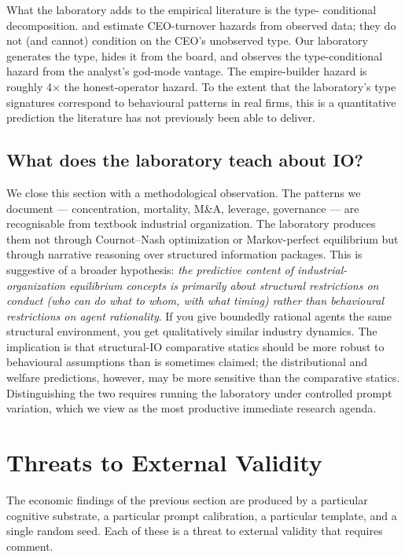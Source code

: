 \documentclass[11pt]{article}
\begin{document}
What the laboratory adds to the empirical literature is the type-
conditional decomposition. \citet{taylor2010ceo} and
\citet{kaplanminton2012} estimate CEO-turnover hazards from
observed data; they do not (and cannot) condition on the CEO's
unobserved type. Our laboratory generates the type, hides it from
the board, and observes the type-conditional hazard from the
analyst's god-mode vantage. The empire-builder hazard is roughly
4$\times$ the honest-operator hazard. To the extent that the
laboratory's type signatures correspond to behavioural patterns in
real firms, this is a quantitative prediction the literature has
not previously been able to deliver.

\subsection{What does the laboratory teach about IO?}

We close this section with a methodological observation. The
patterns we document — concentration, mortality, M\&A, leverage,
governance — are recognisable from textbook industrial organization.
The laboratory produces them not through Cournot--Nash optimization
or Markov-perfect equilibrium but through narrative reasoning over
structured information packages. This is suggestive of a broader
hypothesis: \emph{the predictive content of industrial-organization
equilibrium concepts is primarily about structural restrictions on
conduct (who can do what to whom, with what timing) rather than
behavioural restrictions on agent rationality}. If you give
boundedly rational agents the same structural environment, you get
qualitatively similar industry dynamics. The implication is that
structural-IO comparative statics should be more robust to
behavioural assumptions than is sometimes claimed; the
distributional and welfare predictions, however, may be more
sensitive than the comparative statics. Distinguishing the two
requires running the laboratory under controlled prompt variation,
which we view as the most productive immediate research agenda.

\section{Threats to External Validity}\label{sec:threats}

The economic findings of the previous section are produced by a
particular cognitive substrate, a particular prompt calibration, a
particular template, and a single random seed. Each of these is a
threat to external validity that requires comment.
\end{document}
